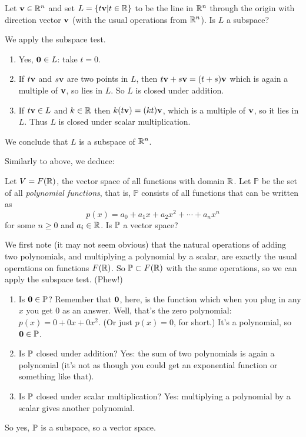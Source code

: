 


\begin{myprob} Let $\mathbf{v} \in \mathbb{R}^n$ and set $L = \{ t\mathbf{v} | t\in \mathbb{R}\}$ to be
the line in $\mathbb{R}^n$ through the origin with direction vector $\mathbf{v}$
(with the usual operations from $\mathbb{R}^n$).  Is $L$ a subspace?

\begin{mysol} We apply the subspace test.
\begin{enumerate}
\item Yes, $\mathbf{0} \in L$: take $t=0$.
\item If $t\mathbf{v}$ and $s\mathbf{v}$ are two points in $L$, then $t\mathbf{v} + s\mathbf{v} = (t+s)\mathbf{v}$
which is again a multiple of $\mathbf{v}$, so lies in $L$.  So $L$ is closed
under addition.
\item If $t\mathbf{v} \in L$ and $k\in\mathbb{R}$ then $k(t\mathbf{v}) = (kt)\mathbf{v}$, which is a 
multiple of $\mathbf{v}$, so it lies in $L$.  Thus $L$ is closed under scalar
multiplication.
\end{enumerate}
We conclude that $L$ is a subspace of $\mathbb{R}^n$. \end{mysol}\end{myprob}

Similarly to above, we deduce:


\begin{myprob} Let $V = F(\mathbb{R})$, the vector space of all functions with domain $\mathbb{R}$.
Let $\mathbb{P}$ be the set of all \emph{polynomial functions}, that is,
$\mathbb{P}$ consists of all functions that can be written as
$$
p(x) = a_0 + a_1 x + a_2 x^2 + \cdots + a_n x^n
$$
for some $n \geq 0$ and $a_i \in \mathbb{R}$.  Is $\mathbb{P}$ a vector space?

\begin{mysol} We first note (it may not seem obvious) that the natural
operations of adding two polynomials, and multiplying a polynomial
by a scalar, are exactly the usual operations on functions $F(\mathbb{R})$.
So $\mathbb{P} \subset F(\mathbb{R})$ with the same operations, so we can apply
the subspace test.  (Phew!)
\begin{enumerate}
\item Is $\mathbf{0} \in \mathbb{P}$?  Remember that $\mathbf{0}$, here, is the
function which when you plug in any $x$ you get $0$ as an answer.
Well, that's the zero polynomial:  $p(x) = 0 + 0x + 0x^2$.  (Or just
$p(x) = 0$, for short.)  It's a polynomial, so $\mathbf{0} \in \mathbb{P}$.
\item Is $\mathbb{P}$ closed under addition?  Yes: the sum of two polynomials
is again a polynomial (it's not as though you could get an exponential
function or something like that).
\item Is $\mathbb{P}$ closed under scalar multiplication?  Yes: multiplying
a polynomial by a scalar gives another polynomial.
\end{enumerate}
So yes, $\mathbb{P}$ is a subspace, so a vector space.
\end{mysol}\end{myprob}


